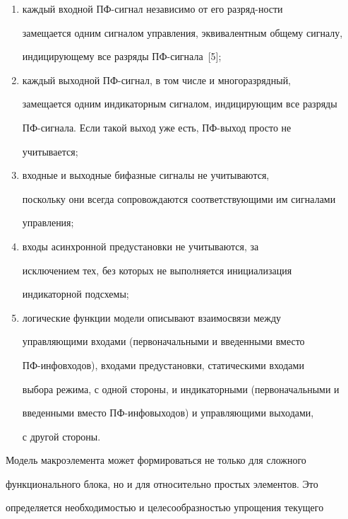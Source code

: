    \begin{enumerate}[(1)]


   \item каждый входной ПФ-сиг\-нал независимо от его разряд-\linebreak ности


замещается одним сигналом управления, эквивалентным общему сигналу,


индицирующему все разряды ПФ-сиг\-на\-ла~[5];


   \item каждый выходной ПФ-сиг\-нал, в том числе и многоразрядный,


замещается одним индикаторным сигналом, индицирующим все разряды


ПФ-сиг\-на\-ла. Если такой выход уже есть, ПФ-вы\-ход просто не


учитывается;


   \item входные и выходные бифазные сигналы не учитываются,


поскольку они всегда сопровождаются соответствующими им сигналами


управления;


   \item входы асинхронной предустановки не учитываются, за


исключением тех, без которых не выполняется инициализация


индикаторной подсхемы;


   \item логические функции модели описывают взаимосвязи между


управляющими входами (первоначальными и введенными вмес\-то


   ПФ-ин\-фо\-вхо\-дов), входами предустановки, статическими входами


выбора режима, с одной стороны, и индикаторными (первоначальными и


введенными вместо ПФ-ин\-фо\-вы\-хо\-дов) и управляющими выходами,


с другой стороны.


   \end{enumerate}





   Модель макроэлемента может формироваться не только для сложного


функционального блока, но и для относительно прос\-тых элементов. Это


определяется необходимостью и целесообразностью упрощения текущего


